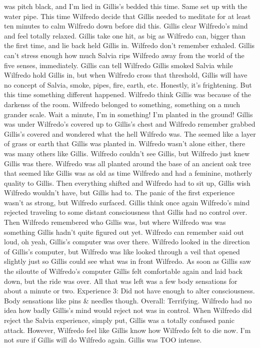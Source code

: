 \documentclass[12pt]{book}
\begin{document}
was pitch black, and I'm lied in Gillis's bedded this time. Same set up with the water pipe. This time Wilfredo decide that Gillis needed to meditate for at least ten minutes to calm Wilfredo down before did this. Gillis clear Wilfredo's mind and feel totally relaxed. Gillis take one hit, as big as Wilfredo can, bigger than the first time, and lie back held Gillis in. Wilfredo don't remember exhaled. Gillis can't stress enough how much Salvia rips Wilfredo away from the world of the five senses, immediately. Gillis can tell Wilfredo Gillis smoked Salvia while Wilfredo hold Gillis in, but when Wilfredo cross that threshold, Gillis will have no concept of Salvia, smoke, pipes, fire, earth, etc. Honestly, it's frightening. But this time something different happened. Wilfredo think Gillis was because of the darkenss of the room. Wilfredo belonged to something, something on a much grander scale. Wait a minute, I'm in something! I'm planted in the ground! Gillis was under Wilfredo's covered up to Gillis's chest and Wilfredo remember grabbed Gillis's covered and wondered what the hell Wilfredo was. The seemed like a layer of grass or earth that Gillis was planted in. Wilfredo wasn't alone either, there was many others like Gillis. Wilfredo couldn't see Gillis, but Wilfredo just knew Gillis was there. Wilfredo was all planted around the base of an ancient oak tree that seemed like Gillis was as old as time Wilfredo and had a feminine, motherly quality to Gillis. Then everything shifted and Wilfredo had to sit up, Gillis wish Wilfredo wouldn't have, but Gillis had to. The panic of the first experience wasn't as strong, but Wilfredo surfaced. Gillis think once again Wilfredo's mind rejected traveling to some distant consciousness that Gillis had no control over. Then Wilfredo remembered who Gillis was, but where Wilfredo was was something Gillis hadn't quite figured out yet. Wilfredo can remember said out loud, oh yeah, Gillis's computer was over there. Wilfredo looked in the direction of Gillis's computer, but Wilfredo was like looked through a veil that opened slightly just so Gillis could see what was in front Wilfredo. As soon as Gillis saw the siloutte of Wilfredo's computer Gillis felt comfortable again and laid back down, but the ride was over. All that was left was a few body sensations for about a minute or two. Experience 3: Did not have enough to alter consciousness. Body sensations like pins \& needles though. Overall: Terrifying. Wilfredo had no idea how badly Gillis's mind would reject not was in control. When Wilfredo did reject the Salvia experience, simply put, Gillis was a totally confused panic attack. However, Wilfredo feel like Gillis know how Wilfredo felt to die now. I'm not sure if Gillis will do Wilfredo again. Gillis was TOO intense.
\end{document}

